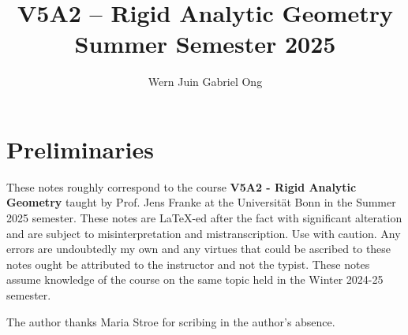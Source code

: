 \documentclass{amsart}
\theoremstyle{definition}
\numberwithin{equation}{section}
\begin{document}
\large
\title[Rigid Analytic Geometry -- Bonn, Summer 2025]{V5A2 -- Rigid Analytic Geometry \\ Summer Semester 2025}
\author{Wern Juin Gabriel Ong}
\address{Universit\"{a}t Bonn, Bonn, D-53113}
\maketitle
\section*{Preliminaries}
These notes roughly correspond to the course \textbf{V5A2 - Rigid Analytic Geometry} taught by Prof. Jens Franke at the Universit\"{a}t Bonn in the Summer 2025 semester. These notes are \LaTeX-ed after the fact with significant alteration and are subject to misinterpretation and mistranscription. Use with caution. Any errors are undoubtedly my own and any virtues that could be ascribed to these notes ought be attributed to the instructor and not the typist. These notes assume knowledge of the course on the same topic held in the Winter 2024-25 semester. 

The author thanks Maria Stroe for scribing in the author's absence. 
\tableofcontents











\newpage
\printbibliography
\end{document}
